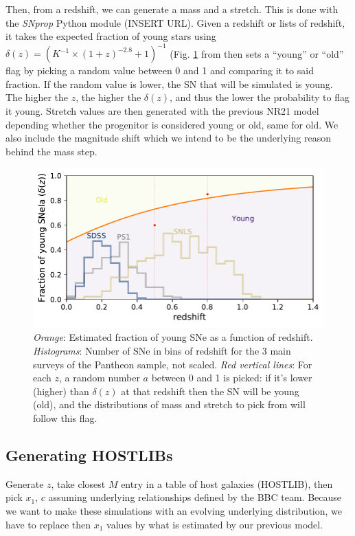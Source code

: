 \documentclass[]{aa}
\begin{document}
Then, from a redshift, we can generate a mass and a stretch. This is done with
the \textit{SNprop} Python module (INSERT URL). Given a redshift or lists of
redshift, it takes the expected fraction of young stars using $\delta(z) =
\left( K^{-1}\times \left( 1+z \right)^{-2.8} + 1 \right)^{-1}$ (Fig.
\ref{fig:deltaz} from \cite{rigault2020} then sets a ``young'' or ``old'' flag
by picking a random value between 0 and 1 and comparing it to said fraction. If
the random value is lower, the SN that will be simulated is young. The higher
the $z$, the higher the $\delta(z)$, and thus the lower the probability to flag
it young. Stretch values are then generated with the previous NR21 model
depending whether the progenitor is considered young or old, same for old. We
also include the magnitude shift which we intend to be the underlying reason
behind the mass step.

\begin{figure}[]
    \centering
    \includegraphics[width=\linewidth]{deltaz_hist_yo-random.pdf}
    \caption{\textit{Orange}: Estimated fraction of young SNe as a function of
        redshift. \textit{Histograms}: Number of SNe in bins of redshift for the
        3 main surveys of the Pantheon sample, not scaled. \textit{Red vertical
        lines}: For each $z$, a random number $a$ between 0 and 1 is picked: if
    it's lower (higher) than $\delta(z)$ at that redshift then the SN will be
young (old), and the distributions of mass and stretch to pick from will follow
this flag.}
    \label{fig:deltaz}
\end{figure}

\subsection{Generating HOSTLIBs}
Generate $z$, take closest $M$ entry in a table of host galaxies (HOSTLIB), then
pick $x_1$, $c$ assuming underlying relationships defined by the BBC team.
Because we want to make these simulations with an evolving underlying
distribution, we have to replace then $x_1$ values by what is estimated by our
previous model. 
\end{document}
